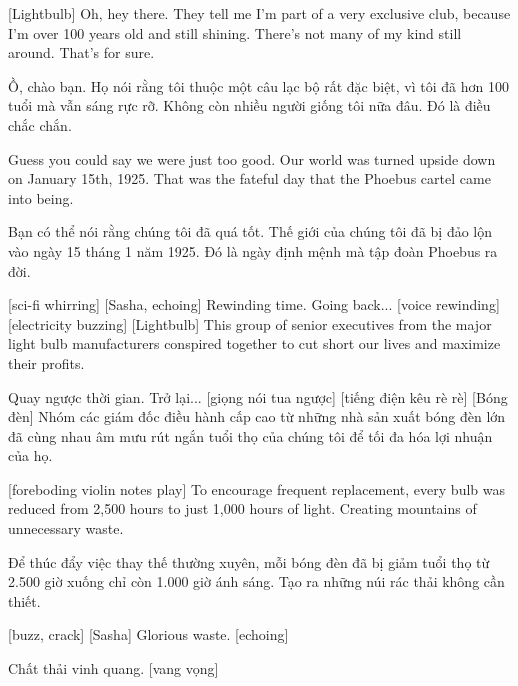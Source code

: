 \documentclass[a4paper]{article}
\begin{document}
	[Lightbulb] Oh, hey there.
	They tell me I'm part of a very exclusive club, because I'm over 100 years old and still shining.
	There's not many of my kind still around. That's for sure.
	
	\begin{vietnamese-v2}
		 Ồ, chào bạn. 
		Họ nói rằng tôi thuộc một câu lạc bộ rất đặc biệt, vì tôi đã hơn 100 tuổi mà vẫn sáng rực rỡ. 
		Không còn nhiều người giống tôi nữa đâu. Đó là điều chắc chắn.
	\end{vietnamese-v2}
	
	Guess you could say we were just too good.
	Our world was turned upside down on January 15th, 1925.
	That was the fateful day that the Phoebus cartel came into being.
	
	\begin{vietnamese-v2}
		Bạn có thể nói rằng chúng tôi đã quá tốt. 
		Thế giới của chúng tôi đã bị đảo lộn vào ngày 15 tháng 1 năm 1925. 
		Đó là ngày định mệnh mà tập đoàn Phoebus ra đời.
	\end{vietnamese-v2}
	
	[sci-fi whirring]
	[Sasha, echoing] Rewinding time.
	Going back...
	[voice rewinding]
	[electricity buzzing]
	[Lightbulb] This group of senior executives from the major light bulb manufacturers conspired together to cut short our lives and maximize their profits.
	
	\begin{vietnamese-v2}
		 Quay ngược thời gian. Trở lại... [giọng nói tua ngược] [tiếng điện kêu rè rè] [Bóng đèn] Nhóm các giám đốc điều hành cấp cao từ những nhà sản xuất bóng đèn lớn đã cùng nhau âm mưu rút ngắn tuổi thọ của chúng tôi để tối đa hóa lợi nhuận của họ.
	\end{vietnamese-v2}
	
	[foreboding violin notes play]
	To encourage frequent replacement, every bulb was reduced from 2,500 hours to just 1,000 hours of light.
	Creating mountains of unnecessary waste.
	
	\begin{vietnamese-v2}
		 Để thúc đẩy việc thay thế thường xuyên, mỗi bóng đèn đã bị giảm tuổi thọ từ 2.500 giờ xuống chỉ còn 1.000 giờ ánh sáng. Tạo ra những núi rác thải không cần thiết.
	\end{vietnamese-v2}
	
	[buzz, crack]
	[Sasha] Glorious waste. [echoing]
	
	\begin{vietnamese-v2}
		 Chất thải vinh quang. [vang vọng]
	\end{vietnamese-v2}
	
\end{document}
